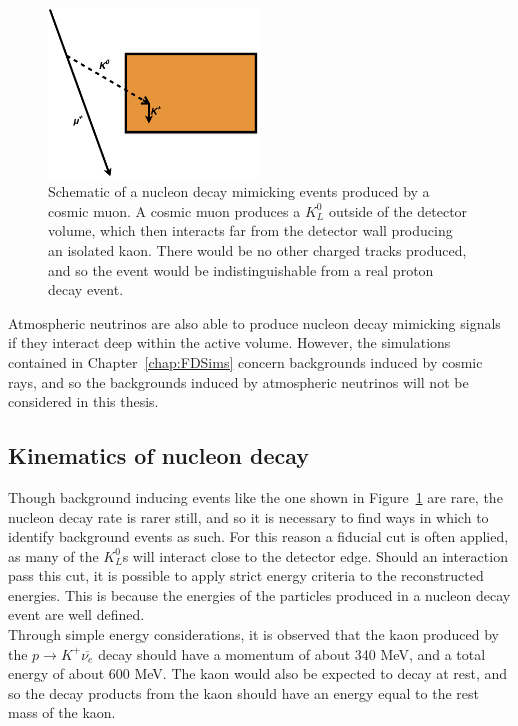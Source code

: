 \begin{figure}
  \centering
  \includegraphics[width=0.5\textwidth]{KaonNDKInteraction}
  \caption[Schematic of a nucleon decay mimicking events produced by a cosmic muon]
          {Schematic of a nucleon decay mimicking events produced by a cosmic muon. A cosmic muon produces a $K^{0}_{L}$ outside of the detector volume, which then interacts far from the detector wall producing an isolated kaon. There would be no other charged tracks produced, and so the event would be indistinguishable from a real proton decay event.}
  \label{fig:K0LongBackground}
\end{figure}

Atmospheric neutrinos are also able to produce nucleon decay mimicking signals if they interact deep within the active volume. However, the simulations contained in Chapter~\ref{chap:FDSims} concern backgrounds induced by cosmic rays, and so the backgrounds induced by atmospheric neutrinos will not be considered in this thesis. \\ 

\subsection{Kinematics of nucleon decay} \label{sec:NDKKin}
Though background inducing events like the one shown in Figure~\ref{fig:K0LongBackground} are rare, the nucleon decay rate is rarer still, and so it is necessary to find ways in which to identify background events as such. For this reason a fiducial cut is often applied, as many of the $K^{0}_{L}$s will interact close to the detector edge. Should an interaction pass this cut, it is possible to apply strict energy criteria to the reconstructed energies. This is because the energies of the particles produced in a nucleon decay event are well defined. \\

Through simple energy considerations, it is observed that the kaon produced by the $p \rightarrow K^{+} \overline{\nu_{e}}$ decay should have a momentum of about 340 MeV, and a total energy of about 600 MeV. The kaon would also be expected to decay at rest, and so the decay products from the kaon should have an energy equal to the rest mass of the kaon. \\

